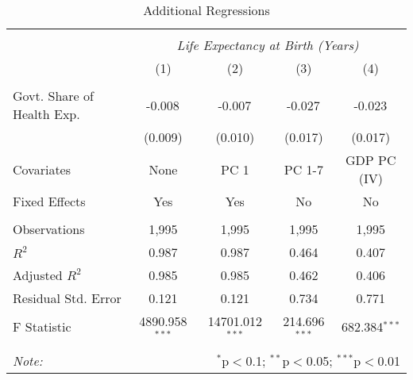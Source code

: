 \begin{table}[!htbp] \centering
  \caption{Additional Regressions \label{additional_regs}}
\begin{tabular}{@{\extracolsep{5pt}}lcccc}
\\[-1.8ex]\hline
\hline \\[-1.8ex]
& \multicolumn{4}{c}{\textit{Life Expectancy at Birth (Years)}} \
\cr \
\\[-1.8ex] & (1) & (2) & (3) & (4) \\
\hline \\[-1.8ex]
 Govt. Share of Health Exp. & -0.008$^{}$ & -0.007$^{}$ & -0.027$^{}$ & -0.023$^{}$ \\
  & (0.009) & (0.010) & (0.017) & (0.017) \\
 Covariates & None & PC 1 & PC 1-7 & GDP PC (IV) \\
 Fixed Effects & Yes & Yes & No & No \\
\hline \\[-1.8ex]
 Observations & 1,995 & 1,995 & 1,995 & 1,995 \\
 $R^2$ & 0.987 & 0.987 & 0.464 & 0.407 \\
 Adjusted $R^2$ & 0.985 & 0.985 & 0.462 & 0.406 \\
 Residual Std. Error & 0.121 & 0.121 & 0.734 & 0.771  \\
 F Statistic & 4890.958$^{***}$  & 14701.012$^{***}$  & 214.696$^{***}$  & 682.384$^{***}$  \\
\hline
\hline \\[-1.8ex]
\textit{Note:} & \multicolumn{4}{r}{$^{*}$p$<$0.1; $^{**}$p$<$0.05; $^{***}$p$<$0.01} \\
\end{tabular}
\end{table}